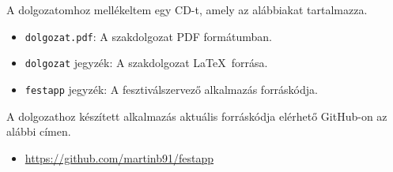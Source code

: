 
A dolgozatomhoz mellékeltem egy CD-t, amely az alábbiakat tartalmazza.

\begin{itemize}
\item \texttt{dolgozat.pdf}: A szakdolgozat PDF formátumban.
\item \texttt{dolgozat} jegyzék: A szakdolgozat \LaTeX\ forrása.
\item \texttt{festapp} jegyzék: A fesztiválszervező alkalmazás forráskódja.
\end{itemize}

\bigskip

\noindent A dolgozathoz készített alkalmazás aktuális forráskódja elérhető GitHub-on az alábbi címen.
\begin{itemize}
\item \url{https://github.com/martinb91/festapp}
\end{itemize}
